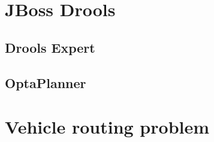 \section{JBoss Drools}

  \subsection{Drools Expert}

  \subsection{OptaPlanner}


\section{Vehicle routing problem}





